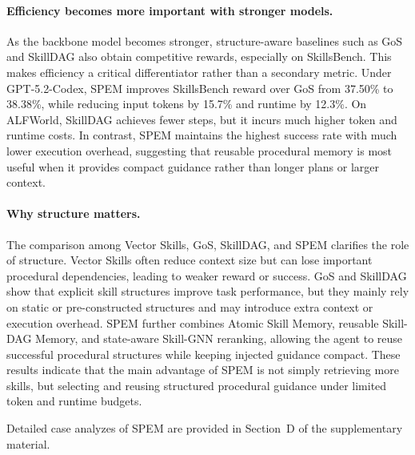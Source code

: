 \documentclass[letterpaper]{article} %
\newcommand{\model}{\textsc{SPEM}}
\begin{document}
\paragraph{Efficiency becomes more important with stronger models.}
As the backbone model becomes stronger, structure-aware baselines such as GoS
and SkillDAG also obtain competitive rewards, especially on SkillsBench. This
makes efficiency a critical differentiator rather than a secondary metric.
Under GPT-5.2-Codex, \model{} improves SkillsBench reward over GoS from
37.50\% to 38.38\%, while reducing input tokens by 15.7\% and runtime by
12.3\%. On ALFWorld, SkillDAG achieves fewer steps, but it incurs much higher
token and runtime costs. In contrast, \model{} maintains the highest success
rate with much lower execution overhead, suggesting that reusable procedural
memory is most useful when it provides compact guidance rather than longer
plans or larger context.

\paragraph{Why structure matters.}
The comparison among Vector Skills, GoS, SkillDAG, and \model{} clarifies the
role of structure. Vector Skills often reduce context size but can lose
important procedural dependencies, leading to weaker reward or success. GoS and
SkillDAG show that explicit skill structures improve task performance, but they
mainly rely on static or pre-constructed structures and may introduce extra
context or execution overhead. \model{} further combines Atomic Skill Memory,
reusable Skill-DAG Memory, and state-aware Skill-GNN reranking, allowing the
agent to reuse successful procedural structures while keeping injected guidance
compact. These results indicate that the main advantage of \model{} is not
simply retrieving more skills, but selecting and reusing structured procedural
guidance under limited token and runtime budgets.

Detailed case analyzes of \model{} are provided in Section~D
of the supplementary material.


\end{document}
